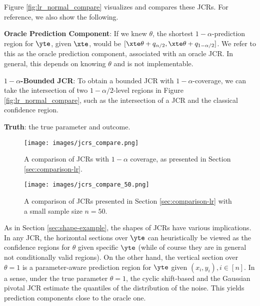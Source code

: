 \documentclass[english]{article}
\begin{document}
Figure \ref{fig:lr_normal_compare} visualizes and compares these JCRs. 
For reference, we also show the following.
 \begin{compactitem}    
    \item {\bf Oracle Prediction Component}: If we knew $\theta$, the shortest $1-\alpha$-prediction region for $\yte$, given $\xte$, would be $[\xte\theta + q_{\alpha/2}, \xte\theta + q_{1-\alpha/2}]$.
    We refer to this as the oracle prediction component, associated with an oracle JCR. In general, this depends on knowing $\theta$ and is not implementable. 
    
    
    \item {\bf $1-\alpha$-Bounded JCR}: To obtain a bounded JCR with $1-\alpha$-coverage, we can take the intersection of two $1-\alpha/2$-level regions in Figure \ref{fig:lr_normal_compare}, such as the intersection of a JCR and the classical confidence region.
    \item {\bf Truth}: the true parameter and outcome.
\end{compactitem}

\begin{figure}[ht]
  \begin{minipage}{0.45\linewidth}
          \texttt{[image: images/jcrs\_compare.png]}
\caption{A comparison of JCRs with $1-\alpha$ coverage, as presented in Section \ref{sec:comparison-lr}.}
\label{fig:lr_normal_compare}
  \end{minipage}
  \qquad
  \begin{minipage}{0.45\linewidth}
        \texttt{[image: images/jcrs\_compare\_50.png]}
\caption{A comparison of JCRs presented in Section \ref{sec:comparison-lr} with a small sample size $n=50$.}
\label{fig:lr_normal_compare_small_samplesize_50}
  \end{minipage}
\end{figure}

   As in Section \ref{sec:shape-example},
   the shapes of JCRs have various implications. 
   In any JCR, the horizontal sections over $\yte$ can heuristically be viewed as the confidence regions for $\theta$ given specific $\yte$ (while of course they are in general not conditionally valid regions). 
   On the other hand, the vertical section over $\theta = 1$ is a parameter-aware prediction region for $\yte$ given $(x_i,y_i), i\in [n]$. 
   In a sense, under the true parameter $\theta= 1$, 
   the cyclic shift-based and the Gaussian pivotal JCR estimate the quantiles of the distribution of the noise.
    This yields prediction components close to the oracle one.  
    
\end{document}
